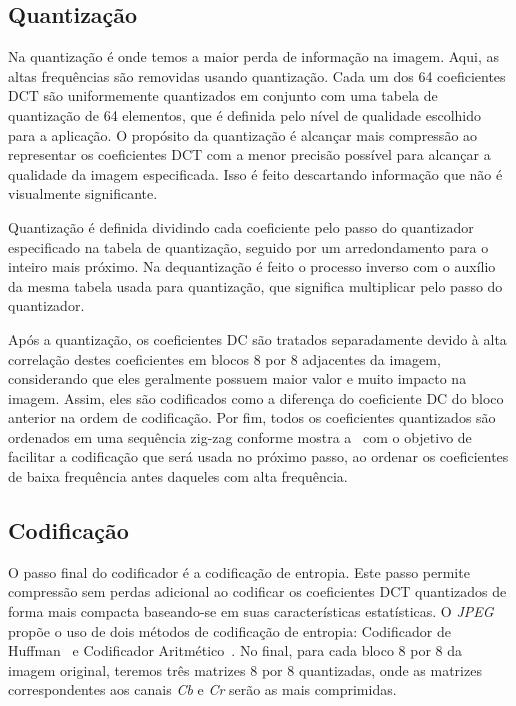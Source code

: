 \subsection{Quantização}
Na quantização é onde temos a maior perda de informação na imagem. Aqui, as altas frequências são removidas usando quantização. Cada um dos 64 coeficientes \acrshort{DCT} são uniformemente quantizados em conjunto com uma tabela de quantização de 64 elementos, que é definida pelo nível de qualidade escolhido para a aplicação. O propósito da quantização é alcançar mais compressão ao representar os coeficientes \acrshort{DCT} com a menor precisão possível para alcançar a qualidade da imagem especificada. Isso é feito descartando informação que não é visualmente significante.

Quantização é definida dividindo cada coeficiente pelo passo do quantizador especificado na tabela de quantização, seguido por um arredondamento para o inteiro mais próximo. Na dequantização é feito o processo inverso com o auxílio da mesma tabela usada para quantização, que significa multiplicar pelo passo do quantizador.

Após a quantização, os coeficientes \acrshort{DC} são tratados separadamente devido à alta correlação destes coeficientes em blocos 8 por 8 adjacentes da imagem, considerando que eles geralmente possuem maior valor e muito impacto na imagem. Assim, eles são codificados como a diferença do coeficiente DC do bloco anterior na ordem de codificação. Por fim, todos os coeficientes quantizados são ordenados em uma sequência zig-zag conforme mostra a~ com o objetivo de facilitar a codificação que será usada no próximo passo, ao ordenar os coeficientes de baixa frequência antes daqueles com alta frequência.
\subsection{Codificação}
O passo final do codificador é a codificação de entropia. Este passo permite compressão sem perdas adicional ao codificar os coeficientes \acrshort{DCT} quantizados de forma mais compacta baseando-se em suas características estatísticas. O \textit{JPEG} propõe o uso de dois métodos de codificação de entropia: Codificador de Huffman~\cite{huffman1952method} e Codificador Aritmético~\cite{pennebaker1988arithmetic}. No final, para cada bloco 8 por 8 da imagem original, teremos três matrizes 8 por 8 quantizadas, onde as matrizes correspondentes aos canais \textit{Cb} e \textit{Cr} serão as mais comprimidas.

